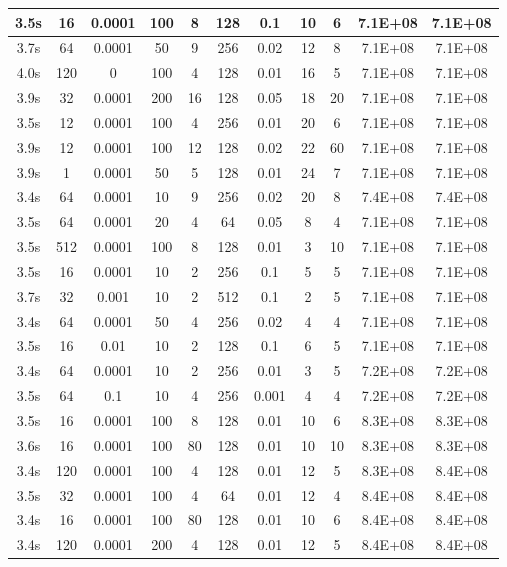 \begin{longtable}{|c|c|c|c|c|c|c|c|c|c|c|}
\endhead
%
3.5s & 16 & 0.0001 & 100 & 8 & 128 & 0.1 & 10 & 6 & 7.1E+08 & 7.1E+08 \\ \hline
3.7s & 64 & 0.0001 & 50 & 9 & 256 & 0.02 & 12 & 8 & 7.1E+08 & 7.1E+08 \\ \hline
4.0s & 120 & 0 & 100 & 4 & 128 & 0.01 & 16 & 5 & 7.1E+08 & 7.1E+08 \\ \hline
3.9s & 32 & 0.0001 & 200 & 16 & 128 & 0.05 & 18 & 20 & 7.1E+08 & 7.1E+08 \\ \hline
3.5s & 12 & 0.0001 & 100 & 4 & 256 & 0.01 & 20 & 6 & 7.1E+08 & 7.1E+08 \\ \hline
3.9s & 12 & 0.0001 & 100 & 12 & 128 & 0.02 & 22 & 60 & 7.1E+08 & 7.1E+08 \\ \hline
3.9s & 1 & 0.0001 & 50 & 5 & 128 & 0.01 & 24 & 7 & 7.1E+08 & 7.1E+08 \\ \hline
3.4s & 64 & 0.0001 & 10 & 9 & 256 & 0.02 & 20 & 8 & 7.4E+08 & 7.4E+08 \\ \hline
3.5s & 64 & 0.0001 & 20 & 4 & 64 & 0.05 & 8 & 4 & 7.1E+08 & 7.1E+08 \\ \hline
3.5s & 512 & 0.0001 & 100 & 8 & 128 & 0.01 & 3 & 10 & 7.1E+08 & 7.1E+08 \\ \hline
3.5s & 16 & 0.0001 & 10 & 2 & 256 & 0.1 & 5 & 5 & 7.1E+08 & 7.1E+08 \\ \hline
3.7s & 32 & 0.001 & 10 & 2 & 512 & 0.1 & 2 & 5 & 7.1E+08 & 7.1E+08 \\ \hline
3.4s & 64 & 0.0001 & 50 & 4 & 256 & 0.02 & 4 & 4 & 7.1E+08 & 7.1E+08 \\ \hline
3.5s & 16 & 0.01 & 10 & 2 & 128 & 0.1 & 6 & 5 & 7.1E+08 & 7.1E+08 \\ \hline
3.4s & 64 & 0.0001 & 10 & 2 & 256 & 0.01 & 3 & 5 & 7.2E+08 & 7.2E+08 \\ \hline
3.5s & 64 & 0.1 & 10 & 4 & 256 & 0.001 & 4 & 4 & 7.2E+08 & 7.2E+08 \\ \hline
3.5s & 16 & 0.0001 & 100 & 8 & 128 & 0.01 & 10 & 6 & 8.3E+08 & 8.3E+08 \\ \hline
3.6s & 16 & 0.0001 & 100 & 80 & 128 & 0.01 & 10 & 10 & 8.3E+08 & 8.3E+08 \\ \hline
3.4s & 120 & 0.0001 & 100 & 4 & 128 & 0.01 & 12 & 5 & 8.3E+08 & 8.4E+08 \\ \hline
3.5s & 32 & 0.0001 & 100 & 4 & 64 & 0.01 & 12 & 4 & 8.4E+08 & 8.4E+08 \\ \hline
3.4s & 16 & 0.0001 & 100 & 80 & 128 & 0.01 & 10 & 6 & 8.4E+08 & 8.4E+08 \\ \hline
3.4s & 120 & 0.0001 & 200 & 4 & 128 & 0.01 & 12 & 5 & 8.4E+08 & 8.4E+08 \\ \hline

\end{longtable}
